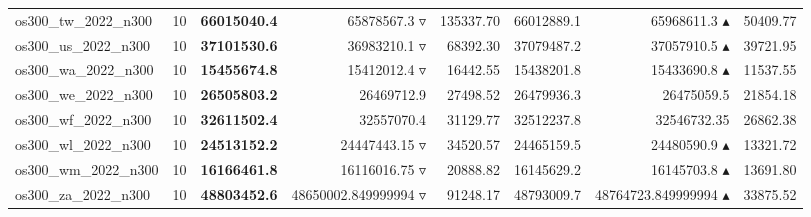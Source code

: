 \begin{table}[]
{\begin{tabular}{ll@{\hspace{1.2cm}}rrr@{\hspace{1.2cm}}rrr}
os300_tw_2022_n300 & 10 & \textbf{66015040.4} & 65878567.3 $\triangledown$ & 135337.70 & 66012889.1 & 65968611.3 $\blacktriangle$ & 50409.77 \\
os300_us_2022_n300 & 10 & \textbf{37101530.6} & 36983210.1 $\triangledown$ & 68392.30 & 37079487.2 & 37057910.5 $\blacktriangle$ & 39721.95 \\
os300_wa_2022_n300 & 10 & \textbf{15455674.8} & 15412012.4 $\triangledown$ & 16442.55 & 15438201.8 & 15433690.8 $\blacktriangle$ & 11537.55 \\
os300_we_2022_n300 & 10 & \textbf{26505803.2} & 26469712.9 \phantom{$\blacktriangle$} & 27498.52 & 26479936.3 & 26475059.5 \phantom{$\blacktriangle$} & 21854.18 \\
os300_wf_2022_n300 & 10 & \textbf{32611502.4} & 32557070.4 \phantom{$\blacktriangle$} & 31129.77 & 32512237.8 & 32546732.35 \phantom{$\blacktriangle$} & 26862.38 \\
os300_wl_2022_n300 & 10 & \textbf{24513152.2} & 24447443.15 $\triangledown$ & 34520.57 & 24465159.5 & 24480590.9 $\blacktriangle$ & 13321.72 \\
os300_wm_2022_n300 & 10 & \textbf{16166461.8} & 16116016.75 $\triangledown$ & 20888.82 & 16145629.2 & 16145703.8 $\blacktriangle$ & 13691.80 \\
os300_za_2022_n300 & 10 & \textbf{48803452.6} & 48650002.849999994 $\triangledown$ & 91248.17 & 48793009.7 & 48764723.849999994 $\blacktriangle$ & 33875.52 \\
\bottomrule
    \end{tabular}
    }
\end{table}
